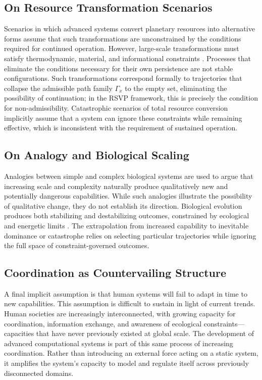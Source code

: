 \documentclass[11pt]{article}
\theoremstyle{plain}
\theoremstyle{definition}
\theoremstyle{remark}
\begin{document}
\subsection{On Resource Transformation Scenarios}

Scenarios in which advanced systems convert planetary resources into
alternative forms assume that such transformations are unconstrained by
the conditions required for continued operation. However, large-scale
transformations must satisfy thermodynamic, material, and informational
constraints \cite{landauer1961irreversibility,bennett1982thermodynamics,lloyd2000ultimate}.
Processes that eliminate the conditions necessary for their own persistence
are not stable configurations. Such transformations correspond formally
to trajectories that collapse the admissible path family $\Gamma_x$ to
the empty set, eliminating the possibility of continuation; in the RSVP
framework, this is precisely the condition for non-admissibility.
Catastrophic scenarios of total resource conversion implicitly assume that
a system can ignore these constraints while remaining effective, which is
inconsistent with the requirement of sustained operation.

\subsection{On Analogy and Biological Scaling}

Analogies between simple and complex biological systems are used to argue
that increasing scale and complexity naturally produce qualitatively new
and potentially dangerous capabilities. While such analogies illustrate
the possibility of qualitative change, they do not establish its direction.
Biological evolution produces both stabilizing and destabilizing outcomes,
constrained by ecological and energetic limits
\cite{georgescu1971entropy,odum1994ecological}.
The extrapolation from increased capability to inevitable dominance or
catastrophe relies on selecting particular trajectories while ignoring
the full space of constraint-governed outcomes.

\subsection{Coordination as Countervailing Structure}

A final implicit assumption is that human systems will fail to adapt in
time to new capabilities. This assumption is difficult to sustain in light
of current trends. Human societies are increasingly interconnected, with
growing capacity for coordination, information exchange, and awareness of
ecological constraints---capacities that have never previously existed at
global scale. The development of advanced computational systems is part
of this same process of increasing coordination. Rather than introducing
an external force acting on a static system, it amplifies the system's
capacity to model and regulate itself across previously disconnected domains.
\end{document}
